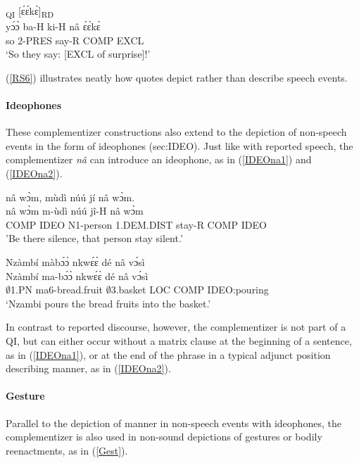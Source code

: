 \begin{exe} 
\ex\label{RS6}
  \glll  [yɔ́ɔ̀ bá kí nâ]\textsubscript{QI} [ɛ́ɛ́kɛ̀]\textsubscript{RD} \\
            yɔ́ɔ̀ ba-H ki-H nâ ɛ́ɛ́kɛ̀ \\
         so 2-PRES say-R COMP EXCL \\
    \trans `So they say: [EXCL of surprise]!'
\end{exe}



\noindent (\ref{RS6}) illustrates neatly how quotes depict rather than describe speech events.


\paragraph{Ideophones} These complementizer constructions also extend to the depiction of non-speech events in the form of ideophones ({sec:IDEO}). Just like with reported speech, the complementizer {\itshape nâ} can introduce an ideophone, as in (\ref{IDEOna1}) and (\ref{IDEOna2}).

\begin{exe} 
\ex\label{IDEOna1}
  \glll nâ wɔ̀m, mùdì núú jí nâ wɔ̀m.  \\
       nâ wɔ̀m m-ùdì núú jî-H nâ wɔ̀m \\
        COMP IDEO N1-person 1.DEM.DIST stay-R COMP IDEO \\
   \trans 'Be there silence, that person stay silent.'
\end{exe}

\begin{exe} 
\ex\label{IDEOna2}
  \glll Nzàmbí màbɔ́ɔ̀ nkwɛ́ɛ̀ dé nâ vɔ́sì \\
        Nzàmbí ma-bɔ́ɔ̀ nkwɛ́ɛ̀ dé nâ vɔ́sì \\
          $\emptyset$1.PN ma6-bread.fruit $\emptyset$3.basket LOC COMP IDEO:pouring\\
    \trans `Nzambi pours the bread fruits into the basket.'
\end{exe}

In contrast to reported discourse, however, the complementizer is not part of a QI, but can either occur without a matrix clause at the beginning of a sentence, as in (\ref{IDEOna1}), or at the end of the phrase in a typical adjunct position describing manner, as in (\ref{IDEOna2}).



\paragraph{Gesture} Parallel to the depiction of manner in non-speech events with ideophones, the complementizer is also used in non-sound depictions of gestures or bodily reenactments, as in (\ref{Gest}).

